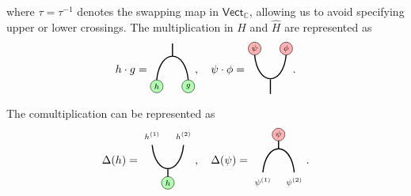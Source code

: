 \documentclass[a4paper,11pt]{article}
\theoremstyle{theorem}
\theoremstyle{remark}
\newcommand{\Cbb}{\mathbb{C}}
\newcommand{\cone}{(1)}
\newcommand{\ctwo}{(2)}
\begin{document}
where $\tau = \tau^{-1}$ denotes the swapping map in $\mathsf{Vect}_{\Cbb}$, allowing us to avoid specifying upper or lower crossings.
The multiplication in $H$ and $\hat{H}$ are represented as 
\begin{equation}
  h\cdot g=  \begin{aligned}
			\begin{tikzpicture}
				 \draw[black, line width=1.0pt]  (-0.5, 0) .. controls (-0.4, 1) and (0.4, 1) .. (0.5, 0);
				 \draw[black, line width=1.0pt]  (0,0.75)--(0,1.15);
			 \filldraw[green!30, draw=black] 
       (-0.5,-0.2) circle (0.2);
    \node at (-0.5, -0.2) {$\scriptstyle h$};
 \filldraw[green!30, draw=black] 
       (0.5,-0.2) circle (0.2);
    \node at (0.5, -0.2) {$\scriptstyle g$};
				\end{tikzpicture}
			\end{aligned},\quad 
   \psi\cdot \phi=
   \begin{aligned}
				\begin{tikzpicture}
					\draw[black, line width=1.0pt]  (-0.5, 1) .. controls (-0.4, 0) and (0.4, 0) .. (0.5, 1);
					\draw[black, line width=1.0pt]  (0,0.23)--(0,-0.23);
					\filldraw[red!30, draw=black] 
        (-0.5,1.2) circle (0.2);
         \node at (-0.5, 1.2) {$\scriptstyle \psi$};
    \filldraw[red!30, draw=black] 
       (0.5,1.2) circle (0.2);
           \node at (0.5, 1.2) {$\scriptstyle \phi$};
				\end{tikzpicture}
			\end{aligned}.
\end{equation}
The comultiplication can be represented as
\begin{equation}
  \Delta(h)=   \begin{aligned}
				\begin{tikzpicture}
					\draw[black, line width=1.0pt]  (-0.5, 1) .. controls (-0.4, 0) and (0.4, 0) .. (0.5, 1);
					\draw[black, line width=1.0pt]  (0,0.23)--(0,-0.23);
				 \filldraw[green!30, draw=black] 
        (0,-0.2) circle (0.2);
         \node at (0, -.2) {$\scriptstyle h$};
                   \node at (-0.5, 1.3) {$\scriptstyle h^{\cone}$};
	                   \node at (0.5, 1.3) {$\scriptstyle h^{\ctwo}$};			
    \end{tikzpicture}
			\end{aligned},\quad 
   \Delta(\psi)=\begin{aligned}
			\begin{tikzpicture}
				 \draw[black, line width=1.0pt]  (-0.5, 0) .. controls (-0.4, 1) and (0.4, 1) .. (0.5, 0);
				 \draw[black, line width=1.0pt]  (0,0.75)--(0,1.15);
			 \filldraw[red!30, draw=black] 
        (0,1.2) circle (0.2);
         \node at (0, 1.2) {$\scriptstyle \psi$};
          \node at (-0.5, -.3) {$\scriptstyle \psi^{\cone}$};
              \node at (0.5, -.3) {$\scriptstyle \psi^{\ctwo}$};
				\end{tikzpicture}
			\end{aligned}.
\end{equation}
\end{document}
